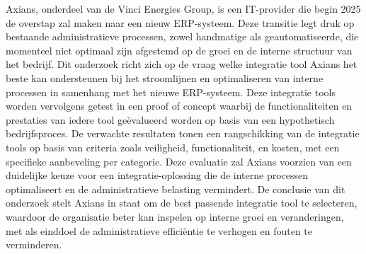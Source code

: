 Axians, onderdeel van de Vinci Energies Group, is een IT-provider die begin 2025 de overstap zal maken naar een nieuw ERP-systeem. Deze transitie legt druk op bestaande administratieve processen, zowel handmatige als geautomatiseerde, die momenteel niet optimaal zijn afgestemd op de groei en de interne structuur van het bedrijf. Dit onderzoek richt zich op de vraag welke integratie tool Axians het beste kan ondersteunen bij het stroomlijnen en optimaliseren van interne processen in samenhang met het nieuwe ERP-systeem. Deze integratie tools worden vervolgens getest in een proof of concept waarbij de functionaliteiten en prestaties van iedere tool geëvalueerd worden op basis van een hypothetisch bedrijfsproces. De verwachte resultaten tonen een rangschikking van de integratie tools op basis van criteria zoals veiligheid, functionaliteit, en kosten, met een specifieke aanbeveling per categorie. Deze evaluatie zal Axians voorzien van een duidelijke keuze voor een integratie-oplossing die de interne processen optimaliseert en de administratieve belasting vermindert. De conclusie van dit onderzoek stelt Axians in staat om de best passende integratie tool te selecteren, waardoor de organisatie beter kan inspelen op interne groei en veranderingen, met als einddoel de administratieve efficiëntie te verhogen en fouten te verminderen.
